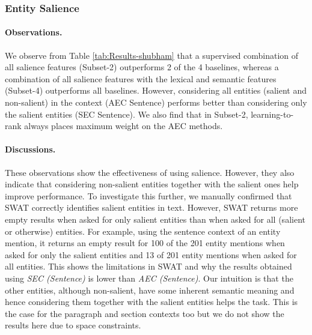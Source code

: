 
\subsubsection{Entity Salience}
\label{subsubsec:Entity Salience}

\paragraph{\textbf{Observations.}}
We observe from Table \ref{tab:Results-shubham} that a supervised combination of all salience features (Subset-2) outperforms 2 of the 4 baselines, whereas a combination of all salience features with the lexical and semantic features (Subset-4) outperforms all baselines. However, considering all entities (salient and non-salient) in the context (AEC Sentence) performs better than considering only the salient entities (SEC Sentence). We also find that in Subset-2, learning-to-rank always places maximum weight on the AEC methods.

\paragraph{\textbf{Discussions.}}
These observations show the effectiveness of using salience. However, they also indicate that considering non-salient entities together with the salient ones help improve performance. To investigate this further, we manually confirmed that SWAT correctly identifies salient entities in text. However, SWAT returns more empty results when asked for only salient entities than when asked for all (salient or otherwise) entities. For example, using the sentence context of an entity mention, it returns an empty result for 100 of the 201 entity mentions when asked for only the salient entities and 13 of 201 entity mentions when asked for all  entities. This shows the limitations in SWAT and why the results obtained using \textit{SEC (Sentence)} is lower than \textit{AEC (Sentence)}.  Our intuition is that the other entities, although non-salient, have some inherent semantic meaning and hence considering them together with the salient entities helps the task. This is the case for the paragraph and section contexts too but we do not show the results here due to space constraints. 

